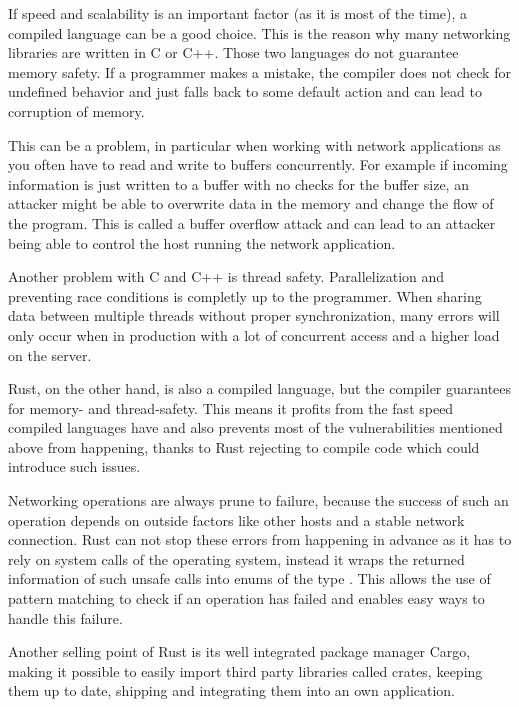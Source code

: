 If speed and scalability is an important factor (as it is most of the time), a compiled language can be a good choice.
This is the reason why many networking libraries are written in C or C++. Those two languages do not guarantee memory
safety. If a programmer makes a mistake, the compiler does not check for undefined behavior and just falls back to some
default action and can lead to corruption of memory.

This can be a problem, in particular when working with network applications as you often have to read and write to
buffers concurrently. For example if incoming information is just written to a buffer with no checks for the buffer
size, an attacker might be able to overwrite data in the memory and change the flow of the program. This is called a
buffer overflow attack and can lead to an attacker being able to control the host running the network application.
\cite{c00buffer}

Another problem with C and C++ is thread safety. Parallelization and preventing race conditions is completly up to the
programmer. When sharing data between multiple threads without proper synchronization, many errors will only occur when
in production with a lot of concurrent access and a higher load on the server.

Rust, on the other hand, is also a compiled language, but the compiler guarantees for memory- and thread-safety. This
means it profits from the fast speed compiled languages have and also prevents most of the vulnerabilities mentioned
above from happening, thanks to Rust rejecting to compile code which could introduce such issues.

Networking operations are always prune to failure, because the success of such an operation depends on outside factors
like other hosts and a stable network connection. Rust can not stop these errors from happening in advance as it has to
rely on system calls of the operating system, instead it wraps the returned information of such unsafe calls into
enums of the type . This allows the use of pattern matching to check if an operation has
failed and enables easy ways to handle this failure.

Another selling point of Rust is its well integrated package manager Cargo, making it possible to easily import third
party libraries called crates, keeping them up to date, shipping and integrating them into an own application.

